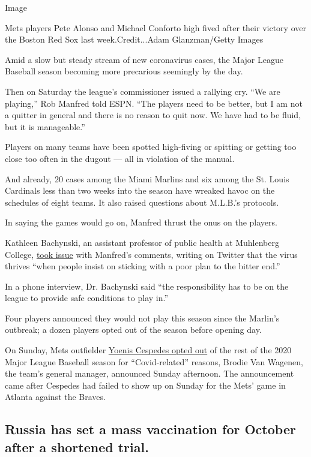 Image

Mets players Pete Alonso and Michael Conforto high fived after their
victory over the Boston Red Sox last week.Credit...Adam Glanzman/Getty
Images

Amid a slow but steady stream of new coronavirus cases, the Major League
Baseball season becoming more precarious seemingly by the day.

Then on Saturday the league's commissioner issued a rallying cry. ``We
are playing,'' Rob Manfred told ESPN. ``The players need to be better,
but I am not a quitter in general and there is no reason to quit now. We
have had to be fluid, but it is manageable.''

Players on many teams have been spotted high-fiving or spitting or
getting too close too often in the dugout --- all in violation of the
manual.

And already, 20 cases among the Miami Marlins and six among the St.
Louis Cardinals less than two weeks into the season have wreaked havoc
on the schedules of eight teams. It also raised questions about M.L.B.'s
protocols.

In saying the games would go on, Manfred thrust the onus on the players.

Kathleen Bachynski, an assistant professor of public health at
Muhlenberg College,
\href{https://twitter.com/bachyns/status/1289665507117772800}{took
issue} with Manfred's comments, writing on Twitter that the virus
thrives ``when people insist on sticking with a poor plan to the bitter
end.''

In a phone interview, Dr. Bachynski said ``the responsibility has to be
on the league to provide safe conditions to play in.''

Four players announced they would not play this season since the
Marlin's outbreak; a dozen players opted out of the season before
opening day.

On Sunday, Mets outfielder
\href{https://www.nytimes.com/2020/08/02/sports/baseball/Yoenis-cespedes-opt-out-rule.html}{Yoenis
Cespedes opted out} of the rest of the 2020 Major League Baseball season
for ``Covid-related'' reasons, Brodie Van Wagenen, the team's general
manager, announced Sunday afternoon. The announcement came after
Cespedes had failed to show up on Sunday for the Mets' game in Atlanta
against the Braves.

\hypertarget{russia-has-set-a-mass-vaccination-for-october-after-a-shortened-trial}{%
\subsection{Russia has set a mass vaccination for October after a
shortened
trial.}\label{russia-has-set-a-mass-vaccination-for-october-after-a-shortened-trial}}


